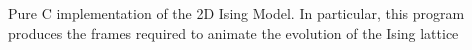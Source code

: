 Pure C implementation of the 2D Ising Model. In particular, this program produces the frames required to animate the evolution of the Ising lattice 